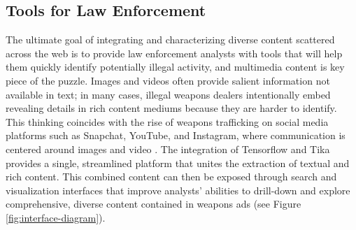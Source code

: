 \subsection{Tools for Law Enforcement} \label{sec:memex-tools}
The ultimate goal of integrating and characterizing diverse content scattered across the web is to provide law enforcement analysts with tools that will help them quickly identify potentially illegal activity, and multimedia content is key piece of the puzzle. Images and videos often provide salient information not available in text; in many cases, illegal weapons dealers intentionally embed revealing details in rich content mediums because they are harder to identify. This thinking coincides with the rise of weapons trafficking on social media platforms such as Snapchat, YouTube, and Instagram, where communication is centered around images and video \cite{socialmedia}. The integration of Tensorflow and Tika provides a single, streamlined platform that unites the extraction of textual and rich content. This combined content can then be exposed through search and visualization interfaces that improve analysts' abilities to drill-down and explore comprehensive, diverse content contained in weapons ads (see Figure \ref{fig:interface-diagram}). 